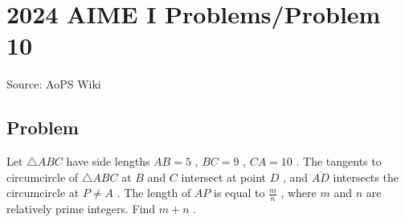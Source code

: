 \documentclass[12pt]{article}
\begin{document}
\section*{{2024 AIME I Problems/Problem 10}}
Source: AoPS Wiki

\subsection*{Problem}
Let $\triangle ABC$ have side lengths $AB=5$ , $BC=9$ , $CA=10$ . The tangents to circumcircle of $\triangle ABC$ at $B$ and $C$ intersect at point $D$ , and $\overline{AD}$ intersects the circumcircle at $P \neq A$ . The length of $AP$ is equal to $\frac{m}{n}$ , where $m$ and $n$ are relatively prime integers. Find $m + n$ .
\end{document}
